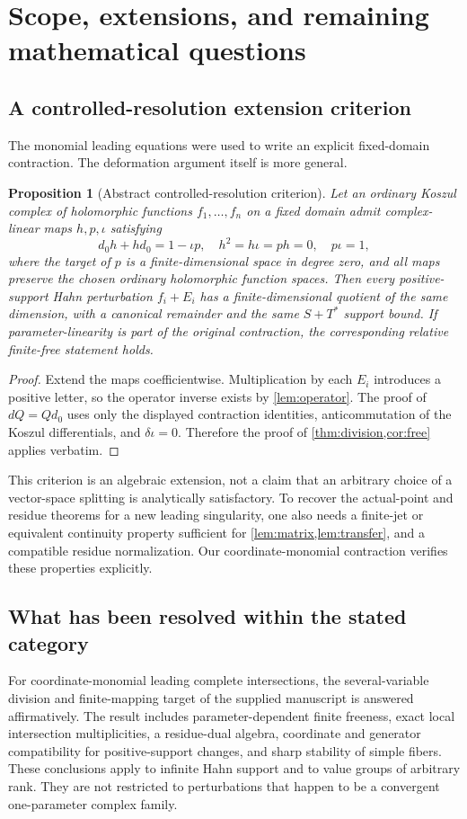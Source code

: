 \documentclass[11pt,letterpaper]{article}
\newtheorem{proposition}[theorem]{Proposition}
\theoremstyle{definition}
\theoremstyle{remark}
\numberwithin{equation}{section}
\begin{document}
\section{Scope, extensions, and remaining mathematical questions}\label{sec:scope}
\subsection{A controlled-resolution extension criterion}
The monomial leading equations were used to write an explicit fixed-domain contraction. The deformation argument itself is more general.

\begin{proposition}[Abstract controlled-resolution criterion]\label{prop:abstract}
Let an ordinary Koszul complex of holomorphic functions $f_1,\ldots,f_n$ on a fixed domain admit complex-linear maps $h,p,\iota$ satisfying
\[
 d_0h+hd_0=1-\iota p,\quad h^2=h\iota=p h=0,\quad p\iota=1,
\]
where the target of $p$ is a finite-dimensional space in degree zero, and all maps preserve the chosen ordinary holomorphic function spaces. Then every positive-support Hahn perturbation $f_i+E_i$ has a finite-dimensional quotient of the same dimension, with a canonical remainder and the same $S+T^*$ support bound. If parameter-linearity is part of the original contraction, the corresponding relative finite-free statement holds.
\end{proposition}
\begin{proof}
Extend the maps coefficientwise. Multiplication by each $E_i$ introduces a positive letter, so the operator inverse exists by \cref{lem:operator}. The proof of $dQ=Qd_0$ uses only the displayed contraction identities, anticommutation of the Koszul differentials, and $\delta\iota=0$. Therefore the proof of \cref{thm:division,cor:free} applies verbatim.
\end{proof}

This criterion is an algebraic extension, not a claim that an arbitrary choice of a vector-space splitting is analytically satisfactory. To recover the actual-point and residue theorems for a new leading singularity, one also needs a finite-jet or equivalent continuity property sufficient for \cref{lem:matrix,lem:transfer}, and a compatible residue normalization. Our coordinate-monomial contraction verifies these properties explicitly.

\subsection{What has been resolved within the stated category}
For coordinate-monomial leading complete intersections, the several-variable division and finite-mapping target of the supplied manuscript is answered affirmatively. The result includes parameter-dependent finite freeness, exact local intersection multiplicities, a residue-dual algebra, coordinate and generator compatibility for positive-support changes, and sharp stability of simple fibers. These conclusions apply to infinite Hahn support and to value groups of arbitrary rank. They are not restricted to perturbations that happen to be a convergent one-parameter complex family.
\end{document}
